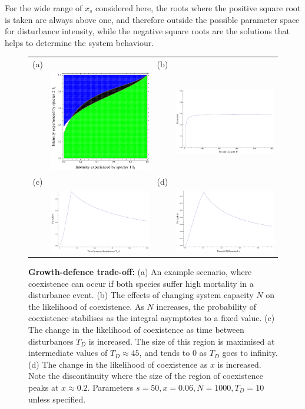 \documentclass[preprint,10pt,reqno]{amsart}
\begin{document}
For the wide range of $x_s$ considered here, the roots where the positive square root is taken are always above one, and therefore outside the possible parameter space for disturbance intensity, while the negative square roots are the solutions that helps to determine the system behaviour.
\begin{figure}[htbp]
\begin{tabular}{cccc}
(a)&&(b)&\\
&\includegraphics[width=2in]{gdx26}&&\includegraphics[width=2in]{gdtointwN} \\
(c)&&(d)&\\
&\includegraphics[width=2in]{gdtointwTd}&&\includegraphics[width=2in]{gdtointwx}
\end{tabular}
\caption{\textbf{Growth-defence trade-off:} (a) An example scenario, where coexistence can occur if both species suffer high mortality in a disturbance event. (b) The effects of changing system capacity $N$ on the likelihood of coexistence. As $N$ increases, the probability of coexistence stabilises as the integral asymptotes to a fixed value. (c) The change in the likelihood of coexistence as time between disturbances $T_D$ is increased. The size of this region is maximised at intermediate values of $T_D \approx 45$, and tends to 0 as $T_D$ goes to infinity. (d) The change in the likelihood of coexistence as $x$ is increased. Note the discontinuity where  the size of the region of coexistence peaks at $x\approx 0.2$. Parameters $s=50,x=0.06,N=1000,T_D=10$ unless specified.}
\label{gd}
\end{figure}
\end{document}
